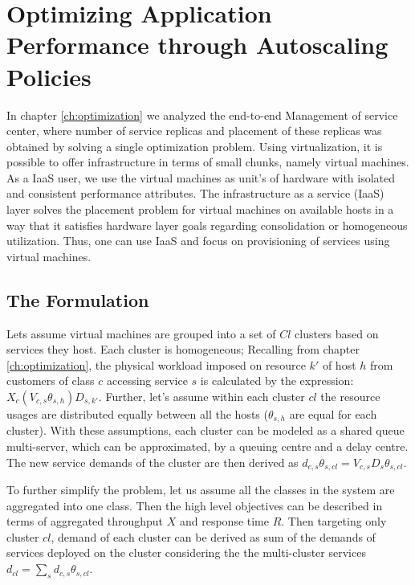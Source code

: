 	\chapter{Optimizing Application Performance through Autoscaling Policies}  
  \label{ch:optimization-virtualized} 
  In chapter \ref{ch:optimization}  we analyzed the end-to-end  Management of service center, where number of service replicas and placement of these replicas was obtained by solving a single optimization problem.  
 Using virtualization, it is possible to offer infrastructure in terms of small chunks, namely virtual machines. As a IaaS user, we use the virtual machines as unit's of hardware with isolated and consistent performance attributes. The infrastructure as a service (IaaS) layer   solves the placement problem for virtual machines on available hosts in a way that it satisfies hardware layer goals regarding consolidation or homogeneous utilization. Thus, one can use IaaS and focus on provisioning of services using virtual machines.  

 \section{The Formulation}
Lets assume virtual machines are grouped into a set of $Cl$ clusters based on services they host. Each cluster is homogeneous; %
   Recalling from chapter \ref{ch:optimization}, the physical workload imposed on resource $k'$ of host $h$ from customers of class $c$ accessing service $s$ is calculated by the expression: $X_c (V_{c,s} \theta_{s,h}) D_{s,k'}$.   Further, let's assume within each cluster $cl$ the resource usages are distributed equally between all the hosts  ($\theta_{s,h}$ are equal  for each cluster). With these assumptions, each cluster can be modeled as a shared queue multi-server, which can be approximated, by a queuing centre and a delay centre. The new service demands of the cluster are then derived as $d_{c,s}\theta_{s,cl}= V_{c,s} D_s \theta_{s,cl}$. 
   
   To further simplify the problem, let us assume all the classes in the system are aggregated into one class. Then the high level objectives can be described in terms of aggregated throughput $X$ and response time $R$.   %
  Then targeting only cluster $cl$, demand of each cluster can be derived as sum of the demands of services deployed on the cluster considering the the multi-cluster services 
  $d_{cl}=\sum_s d_{c,s}\theta_{s,cl}$.    %

